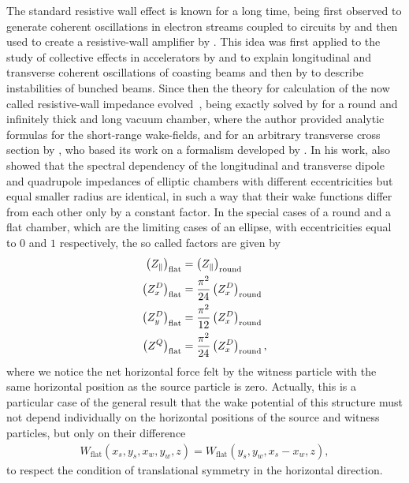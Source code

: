     The standard resistive wall effect is known for a long time, being first observed to generate coherent oscillations in electron streams coupled to circuits by  and then used to create a resistive-wall amplifier by . This idea was first applied to the study of collective effects in accelerators by  and  to explain longitudinal and transverse coherent oscillations of coasting beams and then by  to describe instabilities of bunched beams. Since then the theory for calculation of the now called resistive-wall impedance evolved~\cite{Chao1993}, being exactly solved by  for a round and infinitely thick and long vacuum chamber, where the author provided analytic formulas for the short-range wake-fields, and for an arbitrary transverse cross section by , who based its work on a formalism developed by . In his work, \citeauthor{Yokoya1993} also showed that the spectral dependency of the longitudinal and transverse dipole and quadrupole impedances of elliptic chambers with different eccentricities but equal smaller radius are identical, in such a way that their wake functions differ from each other only by a constant factor. In the special cases of a round and a flat chamber, which are the limiting cases of an ellipse, with eccentricities equal to $0$ and $1$ respectively, the so called \citeauthor{Yokoya1993} factors are given by
    \begin{align}
        \left(Z_\parallel\right)_\text{flat} &=
                        \left(Z_\parallel\right)_\text{round}\\
        \left(Z_x^D\right)_\text{flat} &= \frac{\pi^2}{24}
                        \left(Z_x^D\right)_\text{round}\\
        \left(Z_y^D\right)_\text{flat} &= \frac{\pi^2}{12}
                        \left(Z_x^D\right)_\text{round}\\
        \left(Z^Q\right)_\text{flat} &= \frac{\pi^2}{24}
                        \left(Z_x^D\right)_\text{round},
    \end{align}
    where we notice the net horizontal force felt by the witness particle with the same horizontal position as the source particle is zero. Actually, this is a particular case of the general result that the wake potential of this structure must not depend individually on the horizontal positions of the source and witness particles, but only on their difference
    \begin{align}\nonumber
        W_\text{flat}(x_s,y_s,x_w,y_w,z)=W_\text{flat}(y_s,y_w,x_s-x_w,z),
    \end{align}
    to respect the condition of translational symmetry in the horizontal direction.

